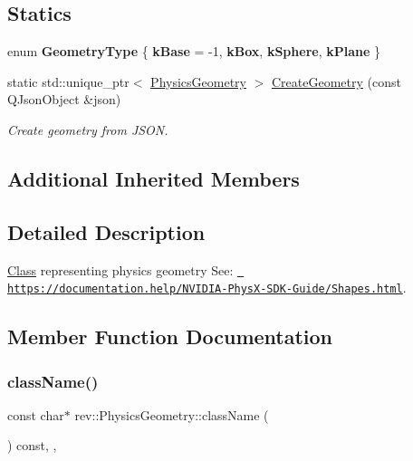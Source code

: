 \subsection*{Statics}
\begin{DoxyCompactItemize}
\item 
\mbox{\label{classrev_1_1_physics_geometry_aada99b618cdc92ab91f33568f79ff9ab}} 
enum {\bfseries Geometry\+Type} \{ {\bfseries k\+Base} = -\/1, 
{\bfseries k\+Box}, 
{\bfseries k\+Sphere}, 
{\bfseries k\+Plane}
 \}
\item 
\mbox{\label{classrev_1_1_physics_geometry_ac64dd6957e27d8bfc667b576514ba017}} 
static std\+::unique\+\_\+ptr$<$ \mbox{\hyperlink{classrev_1_1_physics_geometry}{Physics\+Geometry}} $>$ \mbox{\hyperlink{classrev_1_1_physics_geometry_ac64dd6957e27d8bfc667b576514ba017}{Create\+Geometry}} (const Q\+Json\+Object \&json)
\begin{DoxyCompactList}\small\item\em Create geometry from J\+S\+ON. \end{DoxyCompactList}\end{DoxyCompactItemize}
\subsection*{Additional Inherited Members}


\subsection{Detailed Description}
\mbox{\hyperlink{struct_class}{Class}} representing physics geometry See\+: \href{https://documentation.help/NVIDIA-PhysX-SDK-Guide/Shapes.html}{\texttt{ https\+://documentation.\+help/\+N\+V\+I\+D\+I\+A-\/\+Phys\+X-\/\+S\+D\+K-\/\+Guide/\+Shapes.\+html}}. 

\subsection{Member Function Documentation}
\mbox{\label{classrev_1_1_physics_geometry_afc74d4c03367f3bc83595acaeca7d9a8}} 
\subsubsection{\texorpdfstring{className()}{className()}}
{\footnotesize\ttfamily const char$\ast$ rev\+::\+Physics\+Geometry\+::class\+Name (\begin{DoxyParamCaption}{ }\end{DoxyParamCaption}) const\hspace{0.3cm}{\ttfamily [inline]}, {\ttfamily [override]}, {\ttfamily [virtual]}}



